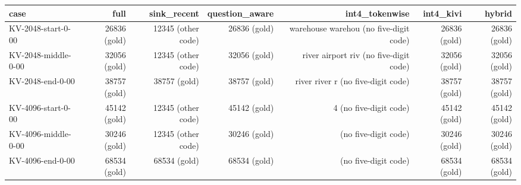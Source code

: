 \begin{tabular}{lrrrrrr}
\toprule
case & full & sink\_recent & question\_aware & int4\_tokenwise & int4\_kivi & hybrid \\
\midrule
KV-2048-start-0-00 & 26836 (gold) & 12345 (other code) & 26836 (gold) &  warehouse warehou (no five-digit code) & 26836 (gold) & 26836 (gold) \\
KV-2048-middle-0-00 & 32056 (gold) & 12345 (other code) & 32056 (gold) &  river airport riv (no five-digit code) & 32056 (gold) & 32056 (gold) \\
KV-2048-end-0-00 & 38757 (gold) & 38757 (gold) & 38757 (gold) &    river  river  r (no five-digit code) & 38757 (gold) & 38757 (gold) \\
KV-4096-start-0-00 & 45142 (gold) & 12345 (other code) & 45142 (gold) &        4 (no five-digit code) & 45142 (gold) & 45142 (gold) \\
KV-4096-middle-0-00 & 30246 (gold) & 12345 (other code) & 30246 (gold) &          (no five-digit code) & 30246 (gold) & 30246 (gold) \\
KV-4096-end-0-00 & 68534 (gold) & 68534 (gold) & 68534 (gold) &          (no five-digit code) & 68534 (gold) & 68534 (gold) \\
\bottomrule
\end{tabular}

